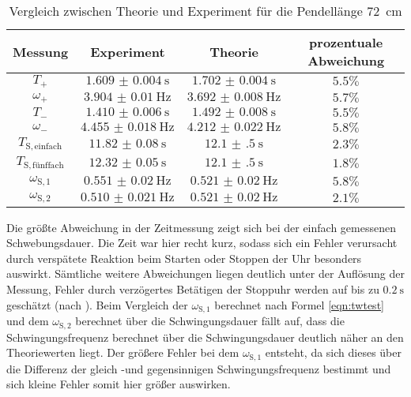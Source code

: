 \begin{table}
	\centering
	\caption{Vergleich zwischen Theorie und Experiment für die Pendellänge 72 \,\si{\centi\meter}}
	\label{tab:discuss2}
	\begin{tabular}{cccc}
		\toprule
		Messung                    & Experiment               & Theorie                  & prozentuale Abweichung \\
		\midrule
		$T_{\mathrm{+}}$           & $\SI{1.609(4)}{\second}$ & $\SI{1.702(4)}{\second}$ & $5.5\%$                \\
		$\omega_{\mathrm{+}}$      & $\SI{3.904(10)}{\Hz}$    & $\SI{3.692(8)}{\Hz}$     & $5.7\%$                \\
		$T_{\mathrm{-}}$           & $\SI{1.410(6)}{\second}$ & $\SI{1.492(8)}{\second}$ & $5.5\% $               \\
		$\omega_{\mathrm{-}}$      & $\SI{4.455(18)}{\hertz}$ & $\SI{4.212(22)}{\Hz}$    & $5.8\%$                \\
		$T_{\mathrm{S,einfach}}$   & $\SI{11.82(8)}{\second}$ & $\SI{12.1(5)}{\second}$  & $2.3\%$                \\
		$T_{\mathrm{S,fünffach}}$ & $\SI{12.32(5)}{\second}$ & $\SI{12.1(5)}{\second}$  & $1.8\%$                \\
		$\omega_{\mathrm{S,1}}$    & $\SI{0.551(20)}{\Hz}$    & $\SI{0.521(20)}{\Hz}$    & $5.8\%$                \\
		$\omega_{\mathrm{S,2}}$    & $\SI{0.510(21)}{\Hz}$    & $\SI{0.521(20)}{\Hz}$    & $2.1\%$                \\

		\bottomrule
	\end{tabular}
\end{table}

Die größte Abweichung in der Zeitmessung zeigt sich bei der einfach gemessenen Schwebungsdauer. Die Zeit war hier recht kurz, sodass sich ein Fehler verursacht durch verspätete Reaktion beim Starten oder Stoppen der Uhr besonders auswirkt.
Sämtliche weitere Abweichungen liegen deutlich unter der Auflösung der Messung, Fehler durch verzögertes Betätigen der Stoppuhr werden auf bis zu $\SI{0.2}{\second}$ geschätzt (nach \cite{CS-Pro}).
Beim Vergleich der $\omega_{\mathrm{S,1}}$ berechnet nach Formel \eqref{eqn:twtest} und dem $\omega_{\mathrm{S,2}}$ berechnet über die Schwingungsdauer fällt auf, dass die Schwingungsfrequenz berechnet über die Schwingungsdauer deutlich näher an den Theoriewerten liegt.
Der größere Fehler bei dem  $\omega_{\mathrm{S,1}}$ entsteht, da sich dieses über die Differenz der gleich -und gegensinnigen Schwingungsfrequenz bestimmt und sich kleine Fehler somit hier größer auswirken.
